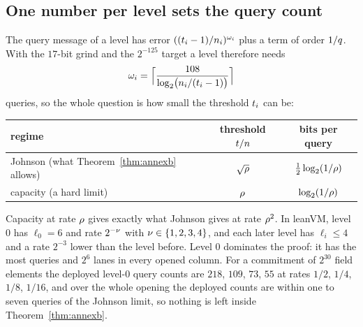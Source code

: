 \subsection{One number per level sets the query count}\label{sec:onenumber}

The query message of a level has error $((t_i-1)/n_i)^{\omega_i}$ plus a term of order $1/q$. With the $17$-bit grind and the $2^{-125}$ target a level therefore needs
\begin{equation}\label{eq:queries}
\omega_i=\Bigl\lceil\frac{108}{\log_2\bigl(n_i/(t_i-1)\bigr)}\Bigr\rceil
\end{equation}
queries, so the whole question is how small the threshold $t_i$ can be:
\begin{center}
\begin{tabular}{lcc}
\toprule
regime & threshold $t/n$ & bits per query\\
\midrule
Johnson (what Theorem~\ref{thm:annexb} allows) & $\sqrt{\rho}$ & $\tfrac12\log_2(1/\rho)$\\
capacity (a hard limit) & $\rho$ & $\log_2(1/\rho)$\\
\bottomrule
\end{tabular}
\end{center}
Capacity at rate $\rho$ gives exactly what Johnson gives at rate $\rho^2$. In leanVM, level $0$ has $\ell_0=6$ and rate $2^{-\nu}$ with $\nu\in\{1,2,3,4\}$, and each later level has $\ell_i\le4$ and a rate $2^{-3}$ lower than the level before. Level $0$ dominates the proof: it has the most queries and $2^6$ lanes in every opened column. For a commitment of $2^{30}$ field elements the deployed level-$0$ query counts are $218$, $109$, $73$, $55$ at rates $1/2$, $1/4$, $1/8$, $1/16$, and over the whole opening the deployed counts are within one to seven queries of the Johnson limit, so nothing is left inside Theorem~\ref{thm:annexb}.
